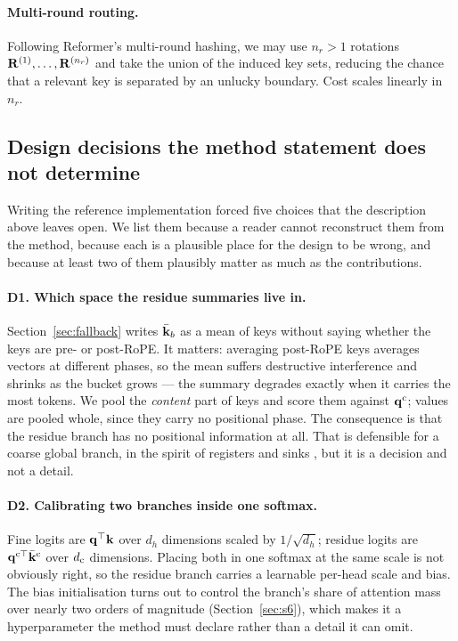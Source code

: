 \paragraph{Multi-round routing.} Following Reformer's multi-round hashing, we may use $n_r > 1$ rotations $\mathbf{R}^{(1)},\dots,\mathbf{R}^{(n_r)}$ and take the union of the induced key sets, reducing the chance that a relevant key is separated by an unlucky boundary. Cost scales linearly in $n_r$.

\subsection{Design decisions the method statement does not determine}
\label{sec:design-decisions}

Writing the reference implementation forced five choices that the description above leaves open. We list them because a reader cannot reconstruct them from the method, because each is a plausible place for the design to be wrong, and because at least two of them plausibly matter as much as the contributions.

\paragraph{D1. Which space the residue summaries live in.} Section~\ref{sec:fallback} writes $\bar{\mathbf{k}}_b$ as a mean of keys without saying whether the keys are pre- or post-RoPE. It matters: averaging post-RoPE keys averages vectors at different phases, so the mean suffers destructive interference and shrinks as the bucket grows --- the summary degrades exactly when it carries the most tokens. We pool the \emph{content} part of keys and score them against $\mathbf{q}^{\mathrm{c}}$; values are pooled whole, since they carry no positional phase. The consequence is that the residue branch has no positional information at all. That is defensible for a coarse global branch, in the spirit of registers \citep{darcet2024registers} and sinks \citep{xiao2024streaming}, but it is a decision and not a detail.

\paragraph{D2. Calibrating two branches inside one softmax.} Fine logits are $\mathbf{q}^\top\mathbf{k}$ over $d_h$ dimensions scaled by $1/\sqrt{d_h}$; residue logits are $\mathbf{q}^{\mathrm{c}\top}\bar{\mathbf{k}}^{\mathrm{c}}$ over $d_{\mathrm{c}}$ dimensions. Placing both in one softmax at the same scale is not obviously right, so the residue branch carries a learnable per-head scale and bias. The bias initialisation turns out to control the branch's share of attention mass over nearly two orders of magnitude (Section~\ref{sec:s6}), which makes it a hyperparameter the method must declare rather than a detail it can omit.

